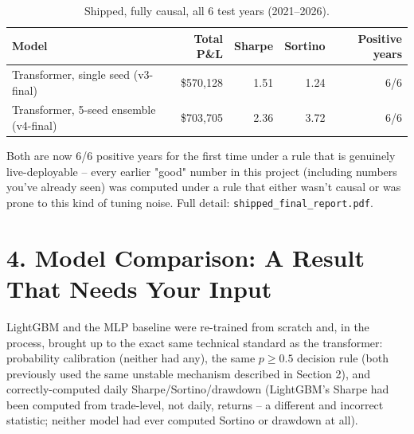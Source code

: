 \documentclass[11pt]{article}
\begin{document}
\begin{table}[H]
\centering
\begin{tabular}{lrrrr}
\toprule
Model & Total P\&L & Sharpe & Sortino & Positive years \\
\midrule
Transformer, single seed (v3-final) & \$570,128 & 1.51 & 1.24 & 6/6 \\
Transformer, 5-seed ensemble (v4-final) & \$703,705 & 2.36 & 3.72 & 6/6 \\
\bottomrule
\end{tabular}
\caption{Shipped, fully causal, all 6 test years (2021--2026).}
\end{table}
Both are now 6/6 positive years for the first time under a rule that is genuinely live-deployable -- every
earlier "good" number in this project (including numbers you've already seen) was computed under a rule that
either wasn't causal or was prone to this kind of tuning noise. Full detail: \texttt{shipped\_final\_report.pdf}.

\section*{4. Model Comparison: A Result That Needs Your Input}
LightGBM and the MLP baseline were re-trained from scratch and, in the process, brought up to the exact same
technical standard as the transformer: probability calibration (neither had any), the same $p\ge0.5$ decision
rule (both previously used the same unstable mechanism described in Section 2), and correctly-computed daily
Sharpe/Sortino/drawdown (LightGBM's Sharpe had been computed from trade-level, not daily, returns -- a
different and incorrect statistic; neither model had ever computed Sortino or drawdown at all).
\end{document}
